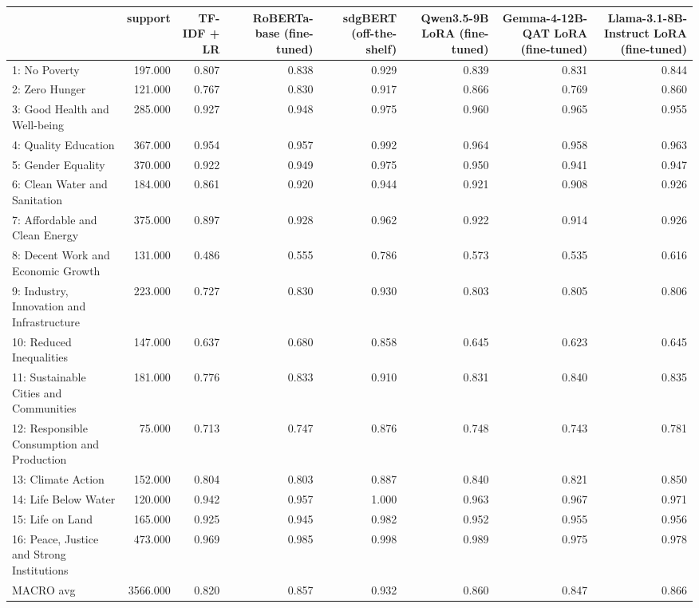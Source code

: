 \begin{tabular}{lrrrrrrr}
\toprule
 & support & TF-IDF + LR & RoBERTa-base (fine-tuned) & sdgBERT (off-the-shelf) & Qwen3.5-9B LoRA (fine-tuned) & Gemma-4-12B-QAT LoRA (fine-tuned) & Llama-3.1-8B-Instruct LoRA (fine-tuned) \\
\midrule
1: No Poverty & 197.000 & 0.807 & 0.838 & 0.929 & 0.839 & 0.831 & 0.844 \\
2: Zero Hunger & 121.000 & 0.767 & 0.830 & 0.917 & 0.866 & 0.769 & 0.860 \\
3: Good Health and Well-being & 285.000 & 0.927 & 0.948 & 0.975 & 0.960 & 0.965 & 0.955 \\
4: Quality Education & 367.000 & 0.954 & 0.957 & 0.992 & 0.964 & 0.958 & 0.963 \\
5: Gender Equality & 370.000 & 0.922 & 0.949 & 0.975 & 0.950 & 0.941 & 0.947 \\
6: Clean Water and Sanitation & 184.000 & 0.861 & 0.920 & 0.944 & 0.921 & 0.908 & 0.926 \\
7: Affordable and Clean Energy & 375.000 & 0.897 & 0.928 & 0.962 & 0.922 & 0.914 & 0.926 \\
8: Decent Work and Economic Growth & 131.000 & 0.486 & 0.555 & 0.786 & 0.573 & 0.535 & 0.616 \\
9: Industry, Innovation and Infrastructure & 223.000 & 0.727 & 0.830 & 0.930 & 0.803 & 0.805 & 0.806 \\
10: Reduced Inequalities & 147.000 & 0.637 & 0.680 & 0.858 & 0.645 & 0.623 & 0.645 \\
11: Sustainable Cities and Communities & 181.000 & 0.776 & 0.833 & 0.910 & 0.831 & 0.840 & 0.835 \\
12: Responsible Consumption and Production & 75.000 & 0.713 & 0.747 & 0.876 & 0.748 & 0.743 & 0.781 \\
13: Climate Action & 152.000 & 0.804 & 0.803 & 0.887 & 0.840 & 0.821 & 0.850 \\
14: Life Below Water & 120.000 & 0.942 & 0.957 & 1.000 & 0.963 & 0.967 & 0.971 \\
15: Life on Land & 165.000 & 0.925 & 0.945 & 0.982 & 0.952 & 0.955 & 0.956 \\
16: Peace, Justice and Strong Institutions & 473.000 & 0.969 & 0.985 & 0.998 & 0.989 & 0.975 & 0.978 \\
MACRO avg & 3566.000 & 0.820 & 0.857 & 0.932 & 0.860 & 0.847 & 0.866 \\
\bottomrule
\end{tabular}
